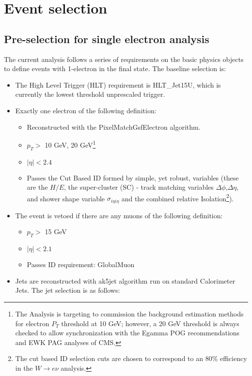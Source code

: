\section{Event selection}
\label{sec:evtsel}

\subsection{Pre-selection for single electron analysis}
The current analysis follows a series of requirements on the basic physics objects to define events with 1-electron in the final state. The baseline selection is:
\begin{itemize}
\item The High Level Trigger (HLT) requirement is HLT\_Jet15U, which is currently the lowest threshold unprescaled trigger. %
\item Exactly one electron of the following definition:
\begin{itemize}
\item Reconstructed with the PixelMatchGsfElectron algorithm.
\item $p_{T} >$ 10 GeV, 20 GeV\footnote{The Analysis is targeting to commission the background estimation methods for electron $P_{T}$ threshold at 10 GeV; however, a 20 GeV threshold is always checked to allow synchronization with the Egamma POG recommendations and EWK PAG analyses of CMS.  }
\item $|\eta| <2.4$
\item Passes the Cut Based ID formed by simple, yet robust, variables (these are the $H/E$, the super-cluster (SC) - track matching variables $\Delta \phi$,$\Delta \eta$, and shower shape variable $\sigma_{i\eta i\eta}$ and the combined relative Isolation\footnote{The cut based ID selection cuts are chosen to correspond to an 80\% efficiency in the $W\rightarrow e\nu$ analysis.}). 
\end{itemize}
\item The event is vetoed if there are any muons of the following definition:
\begin{itemize}
\item $p_{T} >$ 15 GeV
\item $|\eta| <2.1$
\item Passes ID requirement: GlobalMuon
\end{itemize}
\item Jets are reconstructed with ak5jet algorithm run on standard Calorimeter Jets.  The jet selection is as follows:

\end{itemize}
